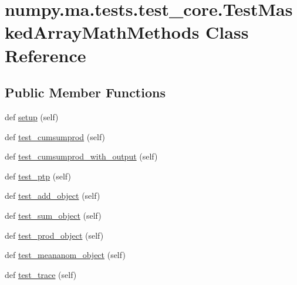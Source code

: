 \hypertarget{classnumpy_1_1ma_1_1tests_1_1test__core_1_1TestMaskedArrayMathMethods}{}\section{numpy.\+ma.\+tests.\+test\+\_\+core.\+Test\+Masked\+Array\+Math\+Methods Class Reference}
\label{classnumpy_1_1ma_1_1tests_1_1test__core_1_1TestMaskedArrayMathMethods}
\subsection*{Public Member Functions}
\begin{DoxyCompactItemize}
\item 
def \hyperlink{classnumpy_1_1ma_1_1tests_1_1test__core_1_1TestMaskedArrayMathMethods_a0c08dcd1dd18ecc5f35a8ceb5fb5d99a}{setup} (self)
\item 
def \hyperlink{classnumpy_1_1ma_1_1tests_1_1test__core_1_1TestMaskedArrayMathMethods_ab58df1b7e15b3f522ad06561fe6588f8}{test\+\_\+cumsumprod} (self)
\item 
def \hyperlink{classnumpy_1_1ma_1_1tests_1_1test__core_1_1TestMaskedArrayMathMethods_abaad5bb6edaea21a09db1d856c8b24d5}{test\+\_\+cumsumprod\+\_\+with\+\_\+output} (self)
\item 
def \hyperlink{classnumpy_1_1ma_1_1tests_1_1test__core_1_1TestMaskedArrayMathMethods_a0e07251fe841e23fa21daa1cd0e5cb16}{test\+\_\+ptp} (self)
\item 
def \hyperlink{classnumpy_1_1ma_1_1tests_1_1test__core_1_1TestMaskedArrayMathMethods_a88b636c0837681ed1d61e0e96f10a751}{test\+\_\+add\+\_\+object} (self)
\item 
def \hyperlink{classnumpy_1_1ma_1_1tests_1_1test__core_1_1TestMaskedArrayMathMethods_aa095209c611fdb5bbd384b094fba8122}{test\+\_\+sum\+\_\+object} (self)
\item 
def \hyperlink{classnumpy_1_1ma_1_1tests_1_1test__core_1_1TestMaskedArrayMathMethods_ac62a635834d0702437acb6f4f3c20593}{test\+\_\+prod\+\_\+object} (self)
\item 
def \hyperlink{classnumpy_1_1ma_1_1tests_1_1test__core_1_1TestMaskedArrayMathMethods_ab3de5dd4ec489bdf8e20192179cd0c42}{test\+\_\+meananom\+\_\+object} (self)
\item 
def \hyperlink{classnumpy_1_1ma_1_1tests_1_1test__core_1_1TestMaskedArrayMathMethods_a5db82ad974b79356ca11d05978296a38}{test\+\_\+trace} (self)

\end{DoxyCompactItemize}
